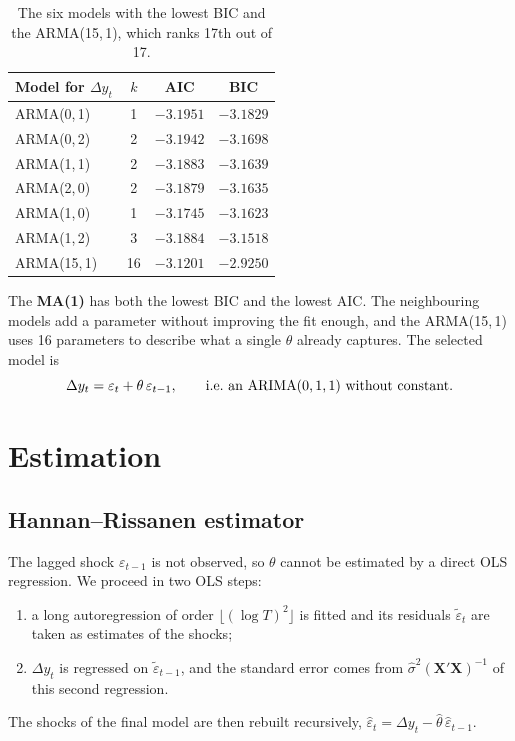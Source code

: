 \documentclass[11pt,a4paper]{article}
\begin{document}
\begin{table}[H]
\centering
\begin{tabular}{lccc}
\toprule
Model for $\Delta y_t$ & $k$ & AIC & BIC \\
\midrule
ARMA(0,\,1) & 1 & $-3.1951$ & $-3.1829$ \\
ARMA(0,\,2) & 2 & $-3.1942$ & $-3.1698$ \\
ARMA(1,\,1) & 2 & $-3.1883$ & $-3.1639$ \\
ARMA(2,\,0) & 2 & $-3.1879$ & $-3.1635$ \\
ARMA(1,\,0) & 1 & $-3.1745$ & $-3.1623$ \\
ARMA(1,\,2) & 3 & $-3.1884$ & $-3.1518$ \\
\midrule
ARMA(15,\,1) & 16 & $-3.1201$ & $-2.9250$ \\
\bottomrule
\end{tabular}
\caption{The six models with the lowest BIC and the ARMA(15,\,1), which ranks 17th out of 17.}
\end{table}

The \textbf{MA(1)} has both the lowest BIC and the lowest AIC. The neighbouring models add a parameter without improving the fit enough, and the ARMA(15,\,1) uses 16 parameters to describe what a single $\theta$ already captures. The selected model is
\begin{equation}
\Delta y_t = \varepsilon_t + \theta\,\varepsilon_{t-1}, \qquad \text{i.e.\ an ARIMA(0,\,1,\,1) without constant.}
\end{equation}

\section{Estimation}

\subsection{Hannan--Rissanen estimator}

The lagged shock $\varepsilon_{t-1}$ is not observed, so $\theta$ cannot be estimated by a direct OLS regression. We proceed in two OLS steps:
\begin{enumerate}
\item a long autoregression of order $\lfloor(\log T)^2\rfloor$ is fitted and its residuals $\tilde\varepsilon_t$ are taken as estimates of the shocks;
\item $\Delta y_t$ is regressed on $\tilde\varepsilon_{t-1}$, and the standard error comes from $\hat\sigma^2(\mathbf{X}'\mathbf{X})^{-1}$ of this second regression.
\end{enumerate}
The shocks of the final model are then rebuilt recursively, $\hat\varepsilon_t = \Delta y_t - \hat\theta\,\hat\varepsilon_{t-1}$.
\end{document}
